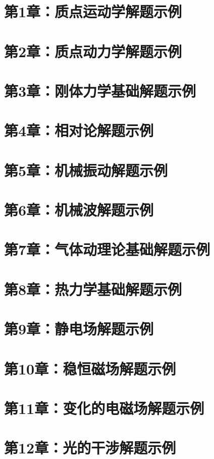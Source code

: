 \documentclass[lang=cn,color=blue,11pt]{elegantbook}
\begin{document}
\section{第1章：质点运动学解题示例}

\section{第2章：质点动力学解题示例}

\section{第3章：刚体力学基础解题示例}

\section{第4章：相对论解题示例}

\section{第5章：机械振动解题示例}

\section{第6章：机械波解题示例}

\section{第7章：气体动理论基础解题示例}

\section{第8章：热力学基础解题示例}

\section{第9章：静电场解题示例}

\section{第10章：稳恒磁场解题示例}

\section{第11章：变化的电磁场解题示例}

\section{第12章：光的干涉解题示例}

\end{document}

